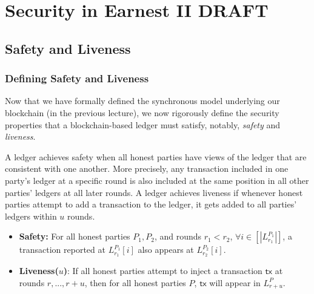 \chapter{Security in Earnest II \small{\textsf{DRAFT}}}\label{chapter:earnest2}
\section{Safety and Liveness}

\subsection{Defining Safety and Liveness}
Now that we have formally defined the synchronous model underlying our blockchain (in the previous lecture), we now rigorously define the security properties that a blockchain-based ledger must satisfy, notably, \textit{safety} and \textit{liveness}.


A ledger achieves safety when all honest parties have views of the ledger that are consistent with one another. More precisely, any transaction included in one party's ledger at a specific round is also included at the same position in all other parties' ledgers at all later rounds.
A ledger achieves liveness if whenever honest parties attempt to add a transaction to the ledger, it gets added to all parties' ledgers within $u$ rounds.

\begin{itemize}
\item \textbf{Safety:} For all honest parties $P_1, P_2$, and rounds $r_1 < r_2$,
$\forall i \in [|L_{r_1}^{P_1}|]$,
a transaction reported at
$L^{P_1}_{r_1}[i]$ also appears at $L^{P_2}_{r_2}[i]$.

\item \textbf{Liveness($u$)}: If all honest parties attempt to inject a transaction $\mathsf{tx}$ at rounds $r,...,r+u$, then for all honest parties $P$, $\mathsf{tx}$ will appear in $L_{r+u}^P$.
\end{itemize}

